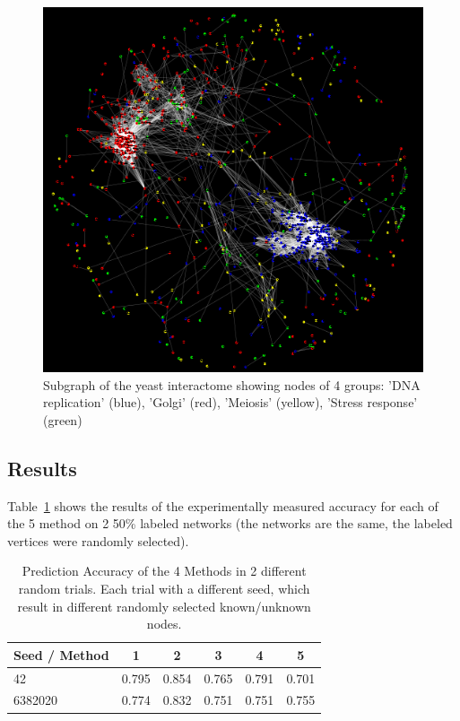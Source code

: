 \begin{figure}[!htb]
\begin{framed}
\centering
\includegraphics[width=\textwidth]{figures/yeastsubgraph_4_groups_colorcode.png}
\caption{Subgraph of the yeast interactome showing nodes of 4 groups: 'DNA
replication' (blue), 'Golgi' (red), 'Meiosis' (yellow), 'Stress response'
(green)}
\label{fig:yeast_subgraph_4groups}
\end{framed}
\end{figure}

\subsection*{Results}

Table~\ref{table:results_5_prediction_methods} shows the results of
the experimentally measured accuracy for each of the 5 method on 2
50\% labeled networks (the networks are the same, the labeled
vertices were randomly selected). 

\begin{table}[!htb]
\caption{Prediction Accuracy of the 4 Methods in 2 different random
trials. Each trial with a different seed, which result in different randomly
selected known/unknown nodes.} 
\begin{center}
\begin{tabular}{ | l | c | c | c | c | c | }
\hline
Seed / Method & 1 & 2 & 3 & 4 & 5\\
\hline
42 & 0.795 & 0.854 & 0.765 &
0.791 & 0.701\\
6382020 & 0.774 & 0.832 & 0.751 & 0.751 & 0.755\\
\hline
\end{tabular}
\label{table:results_5_prediction_methods}
\end{center}
\end{table}

